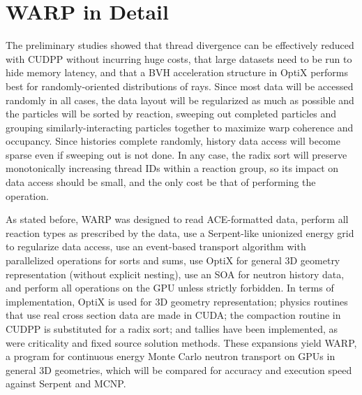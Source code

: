 
\section{WARP in Detail}

The preliminary studies showed that thread divergence can be effectively reduced with CUDPP without incurring huge costs, that large datasets need to be run to hide memory latency, and that a BVH acceleration structure in OptiX performs best for randomly-oriented distributions of rays.  Since most data will be accessed randomly in all cases, the data layout will be regularized as much as possible and the particles will be sorted by reaction, sweeping out completed particles and grouping similarly-interacting particles together to maximize warp coherence and occupancy. 
 Since histories complete randomly, history data access will become sparse even if sweeping out is not done. %
 In any case, the radix sort%
 will preserve monotonically increasing thread IDs within a reaction group, so its impact on data access should be small, and the only cost be that of performing the operation.

As stated before, WARP was designed to read ACE-formatted data, perform all reaction types as prescribed by the data, use a Serpent-like unionized energy grid to regularize data access, use an event-based transport algorithm with parallelized operations for sorts and sums, use OptiX for general 3D geometry representation (without explicit nesting), use an SOA for neutron history data, and perform all operations on the GPU unless strictly forbidden.  In terms of implementation, OptiX is used for 3D geometry representation; physics routines that use real cross section data are made in CUDA; the compaction routine in CUDPP is substituted for a radix sort; and tallies have been implemented, as were criticality and fixed source solution methods.  These expansions yield WARP, a program for continuous energy Monte Carlo neutron transport on GPUs in general 3D geometries, which will be compared for accuracy and execution speed against Serpent and MCNP.

